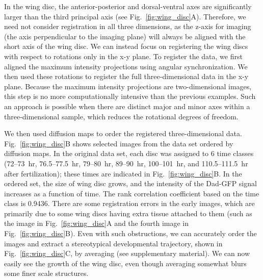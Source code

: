 \documentclass[twocolumn, 10pt]{article}
\newcommand{\SI}[0]{supplementary material}
\newcommand{\fig}[0]{Fig.}
\begin{document}
In the wing disc, the anterior-posterior and dorsal-ventral axes are significantly larger than the third principal axis (see \fig~\ref{fig:wing_disc}A). 
%
Therefore, we need not consider registration in all three dimensions, as the z-axis for imaging (the axis perpendicular to the imaging plane) will always be aligned with the short axis of the wing disc.
%
We can instead focus on registering the wing discs with respect to rotations only in the x-y plane.
%
To register the data, we first aligned the maximum intensity projections using angular synchronization.
%
We then used these rotations to register the full three-dimensional data in the x-y plane.
%
Because the maximum intensity projections are two-dimensional images, this step is no more computationally intensive than the previous examples.
%
Such an approach is possible when there are distinct major and minor axes within a three-dimensional sample, which reduces the rotational degrees of freedom.
%

We then used diffusion maps to order the registered three-dimensional data.
%
\fig~\ref{fig:wing_disc}B shows selected images from the data set ordered by diffusion maps.
%
In the original data set, each disc was assigned to 6 time classes (72--73~hr, 76.5--77.5~hr, 79--80~hr, 89--90~hr, 100--101~hr, and 110.5--111.5~hr after fertilization); these times are indicated in \fig~\ref{fig:wing_disc}B.
%
In the ordered set, the size of wing disc grows, and the intensity of the Dad-GFP signal increases as a function of time.
%
The rank correlation coefficient based on the time class is 0.9436.
%
There are some registration errors in the early images, which are primarily due to some wing discs having extra tissue attached to them (such as the image in \fig~\ref{fig:wing_disc}A and the fourth image in \fig~\ref{fig:wing_disc}B).
%
Even with such obstructions, we can accurately order the images and extract a stereotypical developmental trajectory, shown in \fig~\ref{fig:wing_disc}C, by averaging (see \SI).
%
We can now easily see the growth of the wing disc, even though averaging somewhat blurs some finer scale structures.
%

%
%
%
\end{document}
